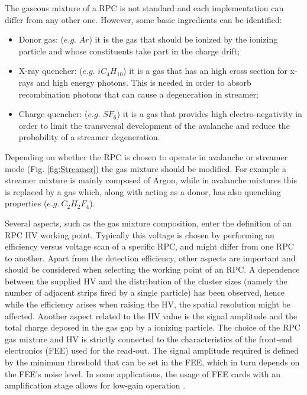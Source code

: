 The gaseous mixture of a RPC is not standard and each implementation can differ from any other one.
However, some basic ingredients can be identified:
\begin{itemize}
\item Donor gas: ($e.g.$ $Ar$) it is the gas that should be ionized by the ionizing particle and whose constituents take part in the charge drift;
\item X-ray quencher: ($e.g.$ $iC_4H_{10}$) it is a gas that has an high cross section for x-rays and high energy photons. This is needed in order to absorb recombination photons that can cause a degeneration in streamer;
\item Charge quencher: ($e.g.$ $SF_6$) it is a gas that provides high electro-negativity in order to limit the transversal development of the avalanche and reduce the probability of a streamer degeneration.
\end{itemize}

Depending on whether the RPC is chosen to operate in avalanche or streamer mode (Fig. \ref{fig:Streamer}) the gas mixture should be modified.
For example a streamer mixture is mainly composed of Argon, while in avalanche mixtures this is replaced by a gas which, along with acting as a donor, has also quenching properties ($e.g.\ C_2H_2F_4$).

Several aspects, such as the gas mixture composition, enter the definition of an RPC HV working point.
Typically this voltage is chosen by performing an efficiency versus voltage scan of a specific RPC, and might differ from one RPC to another.
Apart from the detection efficiency, other aspects are important and should be considered when selecting the working point of an RPC.
A dependence between the supplied HV and the distribution of the cluster sizes (namely the number of adjacent strips fired by a single particle) has been observed, hence while the efficiency arises when raising the HV, the spatial resolution might be affected.
Another aspect related to the HV value is the signal amplitude and the total charge deposed in the gas gap by a ionizing particle.
The choice  of the RPC gas mixture and HV is strictly connected to the characteristics of the front-end electronics (FEE) used for the read-out. 
The signal amplitude required is defined by the minimum threshold that can be set in the FEE, which in turn depends on the FEE’s noise level. 
In some applications, the usage of FEE cards with an amplification stage allows for low-gain operation \cite{Marchisone:2017bcb}.

